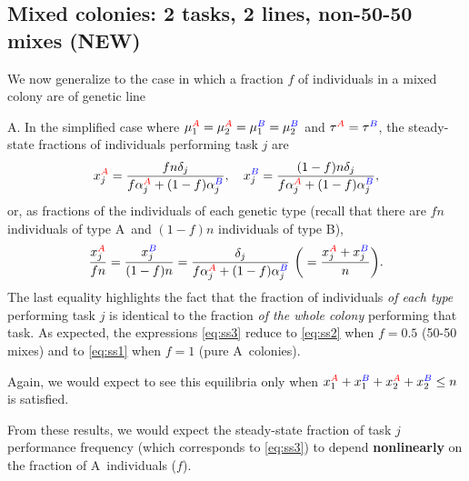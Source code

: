 \documentclass[10pt]{article}
\newcommand{\A}{{\color{red}A}}
\newcommand{\B}{{\color{blue}B}}
\begin{document}
{\color{orange}
\subsection{Mixed colonies: 2 tasks, 2 lines, non-50-50 mixes (NEW)}
We now generalize to the case in which a fraction $f$ of individuals in a mixed colony are of genetic line} \A. In the simplified case where $\mu_1^{\A} = \mu_2^{\A} = \mu_1^{\B} = \mu_2^{\B}$ and $\tau^{\A} = \tau^{\B}$, the steady-state fractions of individuals performing task $j$ are
\begin{equation}
     x_j^{\A} =  \frac{fn\delta_j}{f\alpha_j^{\A} + (1-f)\alpha_j^{\B}}, 
     \quad
     x_j^{\B} =  \frac{(1-f)n\delta_j}{f\alpha_j^{\A} + (1-f)\alpha_j^{\B}}, 
     \label{eq:ss3a}
\end{equation}
or, as fractions of the individuals of each genetic type (recall that there are $fn$ individuals of type \A\ and $(1-f)n$ individuals of type \B),
\begin{equation}
     \frac{x_j^{\A}}{fn} =  \frac{x_j^{\B}}{(1-f)n} = \frac{\delta_j}{f\alpha_j^{\A} + (1-f)\alpha_j^{\B}} \ \bigg(= \frac{x_j^{\A} + x_j^{\B}}{n}\bigg). \label{eq:ss3}
\end{equation}
The last equality highlights the fact that the fraction of individuals \textit{of each type} performing task $j$ is identical to the fraction \textit{of the whole colony} performing that task. As expected, the expressions \eqref{eq:ss3} reduce to \eqref{eq:ss2} when $f=0.5$ (50-50 mixes) and to \eqref{eq:ss1} when $f=1$ (pure \A\ colonies).

Again, we would expect to see this equilibria only when $x_1^{\A} + x_1^{\B} + x_2^{\A}+ x_2^{\B} \leq n$ is satisfied.

{\color{orange}
From these results, we would expect the steady-state fraction of task $j$ performance frequency (which corresponds to \eqref{eq:ss3}) to depend \textbf{nonlinearly} on the fraction of \A\ individuals ($f$). 
}
\end{document}
